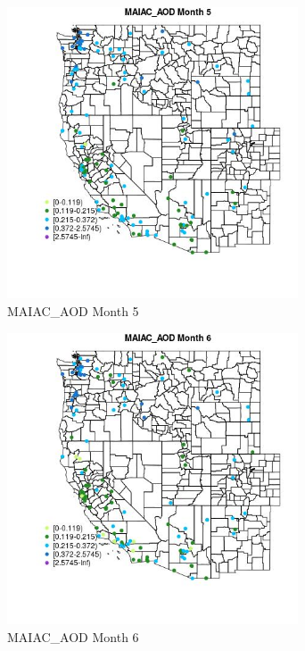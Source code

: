 \begin{figure} 
\centering  
\includegraphics[width=0.77\textwidth]{Code_Outputs/Report_ML_input_PM25_Step4_part_e_de_duplicated_aves_MapObsMo5MAIAC_AOD.jpg} 
\caption{\label{fig:Report_ML_input_PM25_Step4_part_e_de_duplicated_avesMapObsMo5MAIAC_AOD}MAIAC_AOD Month 5} 
\end{figure} 
 

\begin{figure} 
\centering  
\includegraphics[width=0.77\textwidth]{Code_Outputs/Report_ML_input_PM25_Step4_part_e_de_duplicated_aves_MapObsMo6MAIAC_AOD.jpg} 
\caption{\label{fig:Report_ML_input_PM25_Step4_part_e_de_duplicated_avesMapObsMo6MAIAC_AOD}MAIAC_AOD Month 6} 
\end{figure} 
 

